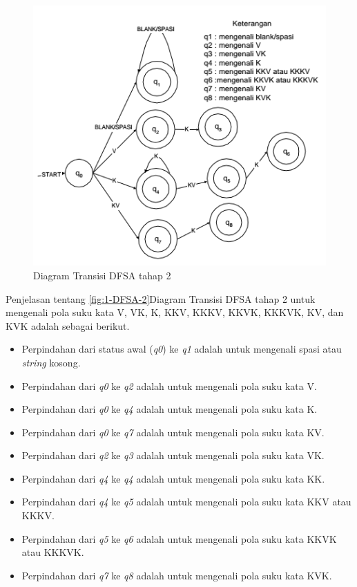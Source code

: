 \begin{figure}[H]
	\centering
	\includegraphics[scale=1.3]{Gambar/DFSA-2}
	\caption{Diagram Transisi DFSA tahap 2\cite{Thomas:2000} 
	\label{fig:2-DFSA-2}}
\end{figure}

Penjelasan tentang \ref{fig:1-DFSA-2}Diagram Transisi DFSA tahap 2 untuk mengenali pola suku kata V, VK, K, KKV, KKKV, KKVK, KKKVK, KV, dan KVK adalah sebagai berikut.

\begin{itemize}
	\item Perpindahan dari status awal (\textit{q0}) ke \textit{q1} adalah untuk mengenali spasi atau \textit{string} kosong.
	\item Perpindahan dari \textit{q0} ke \textit{q2} adalah untuk mengenali pola suku kata V.
	\item Perpindahan dari \textit{q0} ke \textit{q4} adalah untuk mengenali pola suku kata K.
	\item Perpindahan dari \textit{q0} ke \textit{q7} adalah untuk mengenali pola suku kata KV.
	\item Perpindahan dari \textit{q2} ke \textit{q3} adalah untuk mengenali pola suku kata VK.
	\item Perpindahan dari \textit{q4} ke \textit{q4} adalah untuk mengenali pola suku kata KK.
	\item Perpindahan dari \textit{q4} ke \textit{q5} adalah untuk mengenali pola suku kata KKV atau KKKV.
	\item Perpindahan dari \textit{q5} ke \textit{q6} adalah untuk mengenali pola suku kata KKVK atau KKKVK.
	\item Perpindahan dari \textit{q7} ke \textit{q8} adalah untuk mengenali pola suku kata KVK.
\end{itemize}

